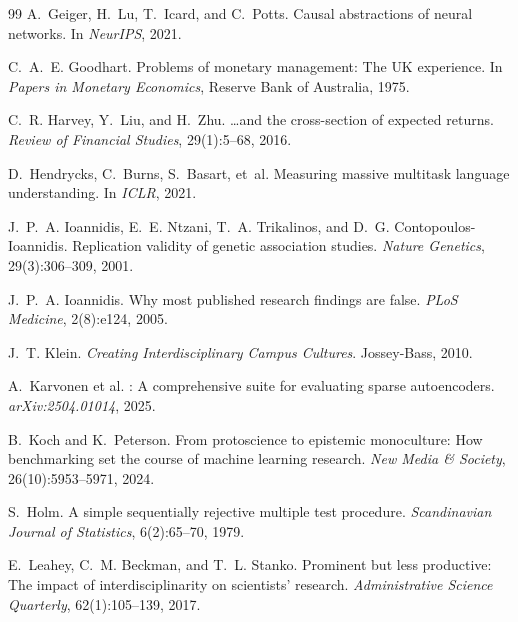\documentclass{article}
\begin{document}
\begin{thebibliography}{99}
A.~Geiger, H.~Lu, T.~Icard, and C.~Potts.
\newblock Causal abstractions of neural networks.
\newblock In \emph{NeurIPS}, 2021.

C.~A.~E. Goodhart.
\newblock Problems of monetary management: The {UK} experience.
\newblock In \emph{Papers in Monetary Economics}, Reserve Bank of Australia, 1975.

C.~R. Harvey, Y.~Liu, and H.~Zhu.
\newblock \ldots and the cross-section of expected returns.
\newblock \emph{Review of Financial Studies}, 29(1):5--68, 2016.

D.~Hendrycks, C.~Burns, S.~Basart, et~al.
\newblock Measuring massive multitask language understanding.
\newblock In \emph{ICLR}, 2021.

J.~P.~A. Ioannidis, E.~E. Ntzani, T.~A. Trikalinos, and D.~G. Contopoulos-Ioannidis.
\newblock Replication validity of genetic association studies.
\newblock \emph{Nature Genetics}, 29(3):306--309, 2001.

J.~P.~A. Ioannidis.
\newblock Why most published research findings are false.
\newblock \emph{PLoS Medicine}, 2(8):e124, 2005.

J.~T. Klein.
\newblock \emph{Creating Interdisciplinary Campus Cultures}.
\newblock Jossey-Bass, 2010.

A.~Karvonen et al.
: A comprehensive suite for evaluating sparse autoencoders.
\newblock \emph{arXiv:2504.01014}, 2025.

B.~Koch and K.~Peterson.
\newblock From protoscience to epistemic monoculture: How benchmarking set the course of machine learning research.
\newblock \emph{New Media \& Society}, 26(10):5953--5971, 2024.

S.~Holm.
\newblock A simple sequentially rejective multiple test procedure.
\newblock \emph{Scandinavian Journal of Statistics}, 6(2):65--70, 1979.

E.~Leahey, C.~M. Beckman, and T.~L. Stanko.
\newblock Prominent but less productive: The impact of interdisciplinarity on scientists' research.
\newblock \emph{Administrative Science Quarterly}, 62(1):105--139, 2017.


\end{thebibliography}
\end{document}
